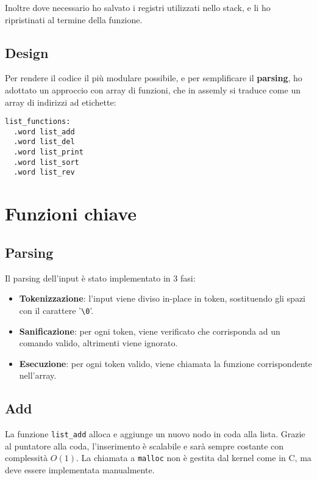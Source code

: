 \documentclass[a4paper,12pt]{article}
\begin{document}
Inoltre dove necessario ho salvato i registri utilizzati nello stack, e li ho ripristinati al termine della funzione.

\subsection{Design}

Per rendere il codice il più modulare possibile, e per semplificare il \textbf{parsing}, ho adottato un approccio con array di funzioni, che in assemly si traduce come un array di indirizzi ad etichette:

\begin{lstlisting}[language=riscv]
list_functions:
  .word list_add
  .word list_del
  .word list_print
  .word list_sort
  .word list_rev
\end{lstlisting}

\section{Funzioni chiave}

\subsection{Parsing}

Il parsing dell'input è stato implementato in 3 fasi:
\begin{itemize}
    \item \textbf{Tokenizzazione}: l'input viene diviso in-place in token, sostituendo gli spazi con il carattere '\texttt{\textbackslash0}'.
    \item \textbf{Sanificazione}: per ogni token, viene verificato che corrisponda ad un comando valido, altrimenti viene ignorato.
    \item \textbf{Esecuzione}: per ogni token valido, viene chiamata la funzione corrispondente nell'array.
\end{itemize}

\subsection{Add}

La funzione \texttt{list\_add} alloca e aggiunge un nuovo nodo in coda alla lista.
Grazie al puntatore alla coda, l'inserimento è scalabile e sarà sempre costante con complessità $O(1)$.
La chiamata a \texttt{malloc} non è gestita dal kernel come in C, ma deve essere implementata manualmente.
\end{document}
